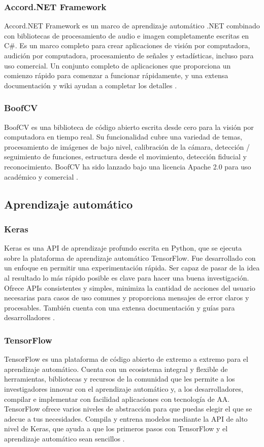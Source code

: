 \subsubsection*{Accord.NET Framework}
Accord.NET Framework es un marco de aprendizaje automático .NET combinado con bibliotecas de procesamiento de audio e imagen completamente escritas en C\#. Es un marco completo para crear aplicaciones de visión por computadora, audición por computadora, procesamiento de señales y estadísticas, incluso para uso comercial. Un conjunto completo de aplicaciones que proporciona un comienzo rápido para comenzar a funcionar rápidamente, y una extensa documentación y wiki ayudan a completar los detalles \cite{Accord.NET}.

\subsubsection*{BoofCV}
BoofCV es una biblioteca de código abierto escrita desde cero para la visión por computadora en tiempo real. Su funcionalidad cubre una variedad de temas, procesamiento de imágenes de bajo nivel, calibración de la cámara, detección / seguimiento de funciones, estructura desde el movimiento, detección fiducial y reconocimiento. BoofCV ha sido lanzado bajo una licencia Apache 2.0 para uso académico y comercial \cite{BoofCV}.

\subsection*{Aprendizaje automático}
\subsubsection*{Keras}
Keras es una API de aprendizaje profundo escrita en Python, que se ejecuta sobre la plataforma de aprendizaje automático TensorFlow. Fue desarrollado con un enfoque en permitir una experimentación rápida. Ser capaz de pasar de la idea al resultado lo más rápido posible es clave para hacer una buena investigación. Ofrece APIs consistentes y simples, minimiza la cantidad de acciones del usuario necesarias para casos de uso comunes y proporciona mensajes de error claros y procesables. También cuenta con una extensa documentación y guías para desarrolladores \cite{Keras}.

\subsubsection*{TensorFlow}
TensorFlow es una plataforma de código abierto de extremo a extremo para el aprendizaje automático. Cuenta con un ecosistema integral y flexible de herramientas, bibliotecas y recursos de la comunidad que les permite a los investigadores innovar con el aprendizaje automático y, a los desarrolladores, compilar e implementar con facilidad aplicaciones con tecnología de AA. TensorFlow ofrece varios niveles de abstracción para que puedas elegir el que se adecue a tus necesidades. Compila y entrena modelos mediante la API de alto nivel de Keras, que ayuda a que los primeros pasos con TensorFlow y el aprendizaje automático sean sencillos \cite{TensorFlow}.

